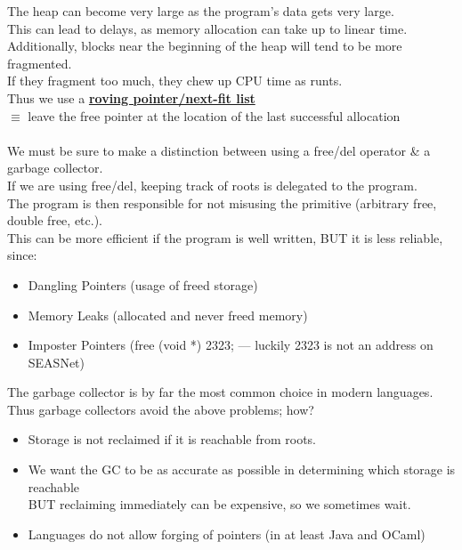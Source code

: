 \documentclass[../../lecture_notes.tex]{subfiles}
\begin{document}
\noindent The heap can become very large as the program’s data gets very large.\\
This can lead to delays, as memory allocation can take up to linear time.\\
Additionally, blocks near the beginning of the heap will tend to be more fragmented.\\
\indent If they fragment too much, they chew up CPU time as runts.\\
Thus we use a \textbf{\underline{roving pointer/next-fit list}}\\
	\indent $\equiv$ leave the free pointer at the location of the last successful allocation\\
\\
We must be sure to make a distinction between using a free/del operator \& a garbage collector.\\
If we are using free/del, keeping track of roots is delegated to the program.\\
The program is then responsible for not misusing the primitive (arbitrary free, double free, etc.).\\
This can be more efficient if the program is well written, BUT it is less reliable, since:
	\begin{itemize} [itemsep=0mm]
		\item Dangling Pointers (usage of freed storage)
		\item Memory Leaks (allocated and never freed memory)
		\item Imposter Pointers (free (void *) 2323; — luckily 2323 is not an address on SEASNet)
	\end{itemize}
The garbage collector is by far the most common choice in modern languages.\\
Thus garbage collectors avoid the above problems; how?
\begin{itemize} [itemsep=0mm]
	\item Storage is not reclaimed if it is reachable from roots.
	\item We want the GC to be as accurate as possible in determining which storage is reachable\\
	        BUT reclaiming immediately can be expensive, so we sometimes wait.
	\item Languages do not allow forging of pointers (in at least Java and OCaml)
\end{itemize} \smallskip
\end{document}
